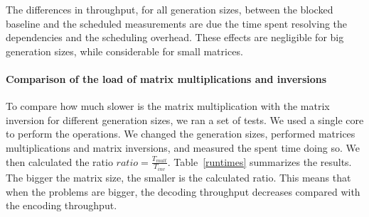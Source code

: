 The differences in throughput, for all generation sizes, between the blocked
baseline and the scheduled measurements are due the time spent resolving the
dependencies and the scheduling overhead. These effects are negligible for big
generation sizes, while considerable for small matrices.

%
%



\paragraph{Comparison of the load of matrix multiplications and inversions}

To compare how much slower is the matrix multiplication with the matrix
inversion for different generation sizes, we ran a set of tests. We used a
single core to perform the operations. We changed the generation sizes,
performed matrices multiplications and matrix inversions, and measured the spent
time doing so. We then calculated the ratio $ratio = \frac{T_{mult}}{T_{inv}}$.
Table~\ref{runtimes} summarizes the results. The bigger the matrix size, the
smaller is the calculated ratio. This means that when the problems are bigger,
the decoding throughput decreases compared with the encoding throughput.

